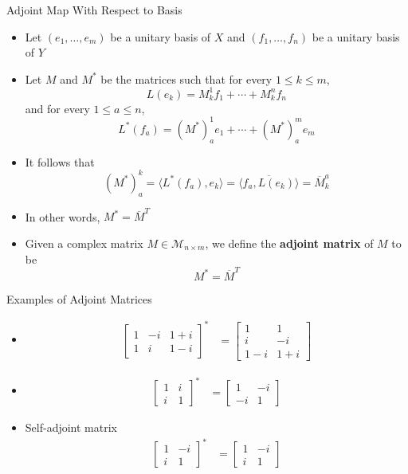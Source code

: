 \documentclass[usenames,dvipsnames,10pt]{beamer}
\begin{document}
\begin{frame}
  {Adjoint Map With Respect to Basis}

  \begin{itemize}
  \item Let $(e_1, \dots, e_m)$ be a unitary basis of $X$ and $(f_1, \dots, f_n)$ be a unitary basis of $Y$
  \item Let $M$ and $M^*$ be the matrices such that for every $1 \le k \le m$,
    \[
      L(e_k) = M_k^1f_1 + \cdots + M_k^nf_n
    \]
    and for every $1 \le a \le n$,
    \[
      L^*(f_a) = (M^*)_a^1e_1 + \cdots + (M^*)_a^me_m
    \]
  \item It follows that
    \[
      (M^*)_a^k = \langle L^*(f_a), e_k\rangle = \overline{\langle f_a, L(e_k)\rangle} = \overline{M}_k^a
    \]
  \item In other words, $M^* = \overline{M}^T$
  \item Given a complex matrix $M \in \mathcal{M}_{n\times m}$, we define the {\bf adjoint matrix} of $M$ to be
    \[
      M^* = \overline{M}^T
    \]
  \end{itemize}
\end{frame}

\begin{frame}
  {Examples of Adjoint Matrices}

  \begin{itemize}
  \item
    \begin{align*}
      \begin{bmatrix} 1 & -i & 1+i \\ 1 & i & 1-i \end{bmatrix}^*
      &= \begin{bmatrix} 1 & 1 \\ i & -i \\ 1-i & 1+i \end{bmatrix}
    \end{align*}
  \item
    \begin{align*}
      \begin{bmatrix} 1 & i \\ i & 1 \end{bmatrix}^*
      &= \begin{bmatrix} 1 & -i \\ -i & 1 \end{bmatrix}
    \end{align*}
  \item Self-adjoint matrix
    \begin{align*}
      \begin{bmatrix} 1 & -i \\  i & 1 \end{bmatrix}^*
      &= \begin{bmatrix} 1 & -i \\ i & 1 \end{bmatrix}
    \end{align*}
  \end{itemize}
\end{frame}
\end{document}
